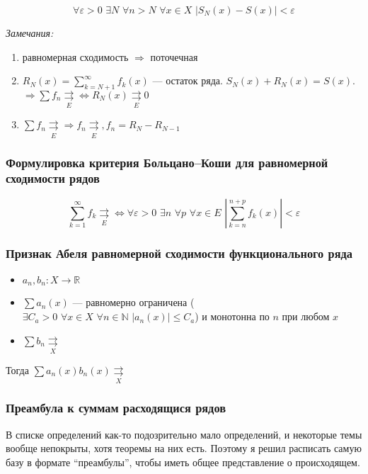 \documentclass{article}
\def\dbl{\,\,}
\def\rsh#1{\underset{#1}{\rightrightarrows}}
\def\rshe{\rsh{E}}
\begin{document}
\[\forall \varepsilon > 0 \dbl \exists N \dbl \forall n > N \dbl \forall x \in X \dbl \left|S_N(x) - S(x)\right| < \varepsilon\]

\textit{Замечания:}

\begin{enumerate}
    \item равномерная сходимость $\Rightarrow$ поточечная
    \item $R_N(x) = \sum_{k = N + 1}^{\infty} f_k(x)$ --- остаток ряда. $S_N(x) + R_N(x) = S(x)$. $\Rightarrow \sum f_n \rshe \Leftrightarrow R_N(x) \rshe 0$
    \item $\sum f_n \rshe \Rightarrow f_n \rshe, f_n = R_{N} - R_{N - 1}$
\end{enumerate}

\subsubsection{Формулировка критерия Больцано--Коши для равномерной сходимости рядов}

\[\sum_{k = 1}^{\infty} f_k \rshe \Leftrightarrow \forall \varepsilon > 0 \dbl \exists n \dbl \forall p \dbl \forall x \in E \dbl \left|\sum_{k = n}^{n + p} f_k(x)\right| < \varepsilon \]

\subsubsection{Признак Абеля равномерной сходимости функционального ряда}

\begin{itemize}
    \item $a_n, b_n: X \rightarrow \mathbb{R}$
    \item $\sum a_n(x)$ --- равномерно ограничена ($\exists C_a > 0 \dbl \forall x \in X \dbl \forall n \in \mathbb{N} \dbl |a_n(x)| \le C_a$) и монотонна по $n$ при любом $x$
    \item $\sum b_n \rsh{X}$
\end{itemize}

Тогда $\sum a_n(x) b_n(x) \rsh{X}$

\subsubsection{Преамбула к суммам расходящися рядов}

В списке определений как-то подозрительно мало определений, и некоторые темы вообще непокрыты, хотя теоремы на них есть. Поэтому я решил расписать самую базу в формате ``преамбулы'', чтобы иметь общее представление о происходящем.
\end{document}
